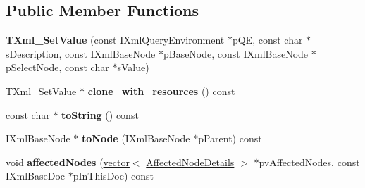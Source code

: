 \subsection*{\-Public \-Member \-Functions}
\begin{DoxyCompactItemize}
\item 
\hypertarget{classgeneral__server_1_1TXml__SetValue_a850d071eb3ac81643f839de90e817955}{{\bfseries \-T\-Xml\-\_\-\-Set\-Value} (const \-I\-Xml\-Query\-Environment $\ast$p\-Q\-E, const char $\ast$s\-Description, const \-I\-Xml\-Base\-Node $\ast$p\-Base\-Node, const \-I\-Xml\-Base\-Node $\ast$p\-Select\-Node, const char $\ast$s\-Value)}\label{classgeneral__server_1_1TXml__SetValue_a850d071eb3ac81643f839de90e817955}

\item 
\hypertarget{classgeneral__server_1_1TXml__SetValue_a4d638eee7fb76cc9159509a79a963ccb}{\hyperlink{classgeneral__server_1_1TXml__SetValue}{\-T\-Xml\-\_\-\-Set\-Value} $\ast$ {\bfseries clone\-\_\-with\-\_\-resources} () const }\label{classgeneral__server_1_1TXml__SetValue_a4d638eee7fb76cc9159509a79a963ccb}

\item 
\hypertarget{classgeneral__server_1_1TXml__SetValue_a9c2f82886b9ec3bc72b462da9cd6fe66}{const char $\ast$ {\bfseries to\-String} () const }\label{classgeneral__server_1_1TXml__SetValue_a9c2f82886b9ec3bc72b462da9cd6fe66}

\item 
\hypertarget{classgeneral__server_1_1TXml__SetValue_a14bb1bfe2892872bd7e051701900ec0d}{\-I\-Xml\-Base\-Node $\ast$ {\bfseries to\-Node} (\-I\-Xml\-Base\-Node $\ast$p\-Parent) const }\label{classgeneral__server_1_1TXml__SetValue_a14bb1bfe2892872bd7e051701900ec0d}

\item 
\hypertarget{classgeneral__server_1_1TXml__SetValue_a4f6a428e3808ddfbd40a5abdede78eea}{void {\bfseries affected\-Nodes} (\hyperlink{classvector}{vector}$<$ \hyperlink{structgeneral__server_1_1TXml_1_1AffectedNodeDetails}{\-Affected\-Node\-Details} $>$ $\ast$pv\-Affected\-Nodes, const \-I\-Xml\-Base\-Doc $\ast$p\-In\-This\-Doc) const }\label{classgeneral__server_1_1TXml__SetValue_a4f6a428e3808ddfbd40a5abdede78eea}

\end{DoxyCompactItemize}
